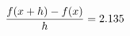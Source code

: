 \documentclass[preview]{standalone}
\begin{document}
\begin{align*}
\special{dvisvgm:raw <g id='unique000'>}\frac{f(x+h)-f(x)}{h} = 2.135\special{dvisvgm:raw </g>}
\end{align*}
\end{document}

